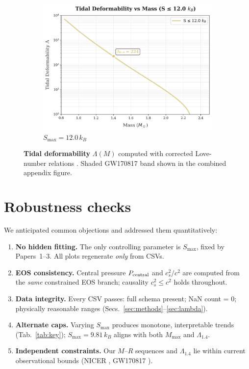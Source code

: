 \documentclass[11pt]{article}
\begin{document}
\begin{figure}[h!]
\begin{subfigure}[t]{0.32\textwidth}
\includegraphics[width=\textwidth]{lambda_vs_mass_12.00kB.png}
\caption{$S_{\max}=12.0\,k_B$}
\end{subfigure}
\caption{\textbf{Tidal deformability} $\Lambda(M)$ computed with corrected Love-number relations \cite{Hinderer2008,YagiYunes2013,YagiYunes2017}. Shaded GW170817 band shown in the combined appendix figure.}
\label{fig:lambda-three}
\end{figure}

\section{Robustness checks}
\label{sec:robust}
We anticipated common objections and addressed them quantitatively:
\begin{enumerate}[leftmargin=1.5em]
\item \textbf{No hidden fitting.} The only controlling parameter is $S_{\max}$, fixed by Papers~1--3. All plots regenerate \emph{only} from CSVs. 
\item \textbf{EOS consistency.} Central pressure $P_{\rm central}$ and $c_s^2/c^2$ are computed from the \emph{same} constrained EOS branch; causality $c_s^2\le c^2$ holds throughout.
\item \textbf{Data integrity.} Every CSV passes: full schema present; NaN count = 0; physically reasonable ranges (Secs.~\ref{sec:methods}–\ref{sec:lambda}).
\item \textbf{Alternate caps.} Varying $S_{\max}$ produces monotone, interpretable trends (Tab.~\ref{tab:key}); $S_{\max}=9.81\,k_B$ aligns with both $M_{\max}$ and $\Lambda_{1.4}$.
\item \textbf{Independent constraints.} Our $M$–$R$ sequences and $\Lambda_{1.4}$ lie within current observational bounds (NICER \cite{Riley2019}, GW170817 \cite{Abbott2018GW170817}).
\end{enumerate}
\end{document}
